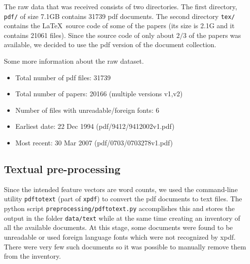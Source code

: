 \documentclass[11pt]{article}
\newcommand{\file}[1]{\texttt{#1}}
\newcommand{\program}[1]{\texttt{#1}}
\begin{document}
    The raw data that was received consists of two directories. 
    The first directory, \file{pdf/} of size 7.1GB contains 31739 pdf documents.
    The second directory \file{tex/}  contains the \LaTeX \ source code of some of the papers 
    (its size is 2.1G and it contains 21061 files). 
    Since the source code of only about $2/3$ of the papers was available, we decided to use 
    the pdf version of the document collection.

        
        
	Some more information about the raw dataset.
	\begin{itemize}
		\item Total number of pdf files: 31739
        \item Total number of papers: 20166 (multiple versions v1,v2)
        \item Number of files with unreadable/foreign fonts: 6
		\item Earliest date: 22 Dec 1994  (pdf/9412/9412002v1.pdf)
		\item Most recent:  30 Mar 2007 (pdf/0703/0703278v1.pdf)
	\end{itemize}
	
	
	
	\subsection{Textual pre-processing}

        Since the intended feature vectors are word counts, we used the command-line utility
        \texttt{pdftotext} (part of \program{xpdf}) to convert the pdf documents to text files.
        The python script \file{preprocessing/pdftotext.py} accomplishes this and stores the
        output in the folder \file{data/text} while at the same time creating an inventory of
        all the available documents.
        At this stage, some documents were found to be unreadable or used foreign language fonts
        which were not recognized by xpdf. There were very few such documents so it was possible
        to manually remove them from the inventory.
\end{document}
